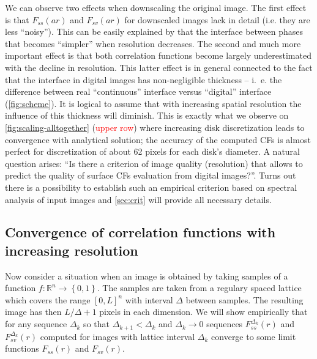 \documentclass[reprint,amsmath,amssymb,aps,pre,showkeys,showpacs]{revtex4-1}
\begin{document}
We can observe two effects when downscaling the original image. The
first effect is that $F_{ss}(ar)$ and $F_{sv}(ar)$ for downscaled images lack in
detail (i.e. they are less ``noisy''). This can be easily explained by that the
interface between phases that becomes ``simpler'' when resolution decreases. The
second and much more important effect is that both correlation functions become
largely underestimated with the decline in resolution. This latter effect is in
general connected to the fact that the interface in digital images has
non-negligible thickness -- i.~e. the difference between real ``continuous''
interface versus ``digital'' interface (\cref{fig:scheme}). It is logical to
assume that with increasing spatial resolution the influence of this thickness
will diminish. This is exactly what we observe on \cref{fig:scaling-alltogether}
(\textcolor{red}{upper row}) where increasing disk discretization leads to
convergence with analytical solution; the accuracy of the computed CFs is almost
perfect for discretization of about 62 pixels for each disk's diameter. A
natural question arises: ``Is there a criterion of image quality (resolution)
that allows to predict the quality of surface CFs evaluation from digital
images?''. Turns out there is a possibility to establish such an empirical
criterion based on spectral analysis of input images and \cref{sec:crit} will
provide all necessary details.

\subsection{Convergence of correlation functions with increasing resolution}
\label{sec:value-noise}
Now consider a situation when an image is obtained by taking samples of a function
$f: \mathbb{R}^n \rightarrow \left\{0, 1\right\}$. The samples are taken from a
regulary spaced lattice which covers the range $[0, L]^n$  with interval
$\Delta$ between samples. The resulting image has then $L/\Delta + 1$ pixels in
each dimension. We will show empirically that for any sequence $\Delta_k$ so
that $\Delta_{k+1} < \Delta_k$ and $\Delta_k \rightarrow 0$ sequences
$F_{ss}^{\Delta_k}(r)$ and $F_{sv}^{\Delta_k}(r)$ computed for images with
lattice interval $\Delta_k$ converge to some limit functions $F_{ss}(r)$ and
$F_{sv}(r)$.
\end{document}
